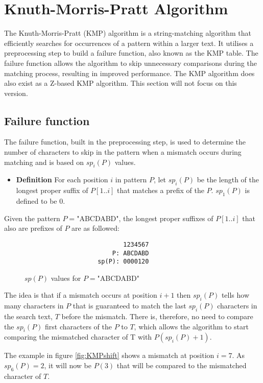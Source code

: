 
\section{Knuth-Morris-Pratt Algorithm}
The Knuth-Morris-Pratt (KMP) algorithm is a string-matching algorithm that efficiently searches for occurrences of a pattern within a larger text. It utilises a preprocessing step to build a failure function, also known as the KMP table. The failure function allows the algorithm to skip unnecessary comparisons during the matching process, resulting in improved performance. The KMP algorithm does also exist as a Z-based KMP algorithm. This section will not focus on this version.

\subsection{Failure function}
The failure function, built in the preprocessing step, is used to determine the number of characters to skip in the pattern when a mismatch occurs during matching and is based on $sp_i(P)$ values.

\begin{itemize}
    \item[] \textbf{Definition} For each position $i$ in pattern $P$, let $sp_i(P)$ be the length of the longest proper suffix of $P[1..i]$ that matches a prefix of the $P$. $sp_1(P)$ is defined to be 0.
\end{itemize}

Given the pattern $P=$"ABCDABD", the longest proper suffixes of $P[1..i]$ that also are prefixes of $P$ are as followed:

\begin{figure}[H]
\begin{verbatim}
                           1234567
                        P: ABCDABD
                    sp(P): 0000120
\end{verbatim}
\caption{$sp(P)$ values for  $P=$"ABCDABD"}
\label{fig:spP}
\end{figure}
The idea is that if a mismatch occurs at position $i+1$ then $sp_{i}(P)$ tells how many characters in $P$ that is guaranteed to match the last $sp_i(P)$ characters in the search text, $T$ before the mismatch. There is, therefore, no need to compare the  $sp_i(P)$ first characters of the $P$ to $T$, which allows the algorithm to start comparing the mismatched character of T with $P(sp_i(P)+1)$.

The example in figure \ref{fig:KMPshift} shows a mismatch at position $i=7$. As $sp_{6}(P) = 2$, it will now be $P(3)$ that will be compared to the mismatched character of $T$. 

